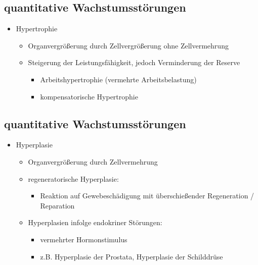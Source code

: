\subsection{quantitative Wachstumsstörungen}
	\begin{itemize}
		\item Hypertrophie
			\begin{itemize}
				\item Organvergrößerung durch Zellvergrößerung ohne Zellvermehrung
				\item Steigerung der Leistungsfähigkeit, jedoch Verminderung der Reserve
					\begin{itemize}
						\item Arbeitshypertrophie (vermehrte Arbeitsbelastung)
						\item kompensatorische Hypertrophie
					\end{itemize}
			\end{itemize}
	\end{itemize}

\subsection{quantitative Wachstumsstörungen}
	\begin{itemize}
		\item Hyperplasie
			\begin{itemize}
				\item Organvergrößerung durch Zellvermehrung
				\item regeneratorische Hyperplasie:
					\begin{itemize}
						\item Reaktion auf Gewebeschädigung mit überschießender Regeneration / Reparation
					\end{itemize}
				\item Hyperplasien infolge endokriner Störungen:
					\begin{itemize}
						\item vermehrter Hormonstimulus
						\item z.B. Hyperplasie der Prostata, Hyperplasie der Schilddrüse
					\end{itemize}
			\end{itemize}
	\end{itemize}

